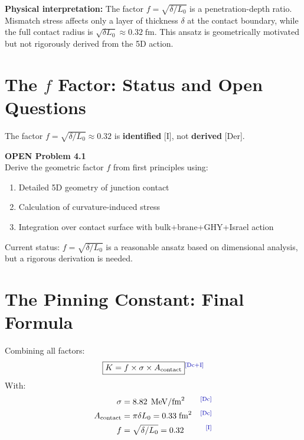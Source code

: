 \textbf{Physical interpretation:} The factor $f = \sqrt{\delta/L_0}$ is a
penetration-depth ratio. Mismatch stress affects only a layer of thickness
$\delta$ at the contact boundary, while the full contact radius is
$\sqrt{\delta L_0} \approx 0.32\;\text{fm}$. This ansatz is geometrically
motivated but not rigorously derived from the 5D action.

\section{The $f$ Factor: Status and Open Questions}
\label{sec:sigmaK:f_open}

The factor $f = \sqrt{\delta/L_0} \approx 0.32$ is \textbf{identified} [I], not
\textbf{derived} [Der].

\begin{edcopenbox}
    \textbf{OPEN Problem 4.1} \tagOPEN \\
    Derive the geometric factor $f$ from first principles using:
    \begin{enumerate}
        \item Detailed 5D geometry of junction contact
        \item Calculation of curvature-induced stress
        \item Integration over contact surface with bulk+brane+GHY+Israel action
    \end{enumerate}
    Current status: $f = \sqrt{\delta/L_0}$ is a reasonable ansatz based on
    dimensional analysis, but a rigorous derivation is needed.
\end{edcopenbox}

\section{The Pinning Constant: Final Formula}
\label{sec:sigmaK:final}

\begin{derivationbox}[title=Pinning Constant Derivation]
    Combining all factors:
    \begin{equation}
        \boxed{\Kpin = f \times \bsigma \times A_{\text{contact}}} \tagDcI
        \label{eq:K_formula}
    \end{equation}
    With:
    \begin{align}
        \bsigma &= 8.82\;\MeV/\text{fm}^2 & \tagDc \\
        A_{\text{contact}} &= \pi\delta L_0 = 0.33\;\text{fm}^2 & \tagDc \\
        f &= \sqrt{\delta/L_0} = 0.32 & \tagI
    \end{align}
\end{derivationbox}

